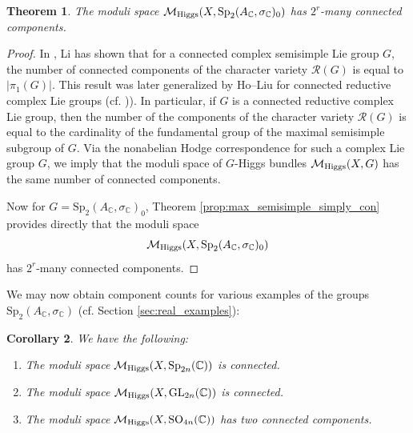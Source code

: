 \documentclass[oneside,11pt]{amsart}
\newtheorem{thm}{Theorem}[section]
\newtheorem{cor}[thm]{Corollary}
\theoremstyle{definition}
\theoremstyle{remark}
\numberwithin{thm}{section}
\numberwithin{equation}{section}
\begin{document}
\begin{thm}\label{thm:comp_count_identity_Sp}
The moduli space $\mathcal{M}_{\rm Higgs}(X,\mathrm{Sp}_2(A_\mathbb{C}, \sigma_{\mathbb{C}})_0)$ has $2^r$-many connected components.
\end{thm}

\begin{proof}
In \cite[Theorem 0.1]{Li}, Li has shown that for a connected complex semisimple Lie group $G$, the number of connected components of the character variety $\mathcal{R}(G)$ is equal to $\vert\pi_1(G)\vert$. This result was later generalized by Ho--Liu for connected reductive complex Lie groups (cf. \cite[Appendix A]{LR15})). In particular, if $G$ is a connected reductive complex Lie group, then the number of the components of the character variety $\mathcal{R}(G)$ is equal to the cardinality of the fundamental group of the maximal semisimple subgroup of $G$. Via the nonabelian Hodge correspondence for such a complex Lie group $G$, we imply that the moduli space of $G$-Higgs bundles $\mathcal{M}_{\rm Higgs}(X,G)$ has the same number of connected components. 

\noindent Now for $G=\mathrm{Sp}_2(A_\mathbb{C}, \sigma_{\mathbb{C}})_0$, Theorem \ref{prop:max_semisimple_simply_con} provides directly that the moduli space 
\[\mathcal{M}_{\rm Higgs}(X,\mathrm{Sp}_2(A_\mathbb{C}, \sigma_{\mathbb{C}})_0)\]
has $2^r$-many connected components.
\end{proof}

We may now obtain component counts for various examples of the groups $\mathrm{Sp}_2(A_\mathbb{C}, \sigma_{\mathbb{C}}) $ (cf. Section \ref{sec:real_examples}):

\begin{cor}\label{cor:comp_counts_specific} We have the following: 
\begin{enumerate}
 \item The moduli space $\mathcal{M}_{\rm Higgs}(X,\mathrm{Sp}_{2n}(\mathbb{C}))$ is connected.
 \item The moduli space $\mathcal{M}_{\rm Higgs}(X,\mathrm{GL}_{2n}(\mathbb{C}))$ is connected.
 \item The moduli space $\mathcal{M}_{\rm Higgs}(X,\mathrm{SO}_{4n}(\mathbb{C}))$ has two connected components.
\end{enumerate}    
\end{cor}
\end{document}
